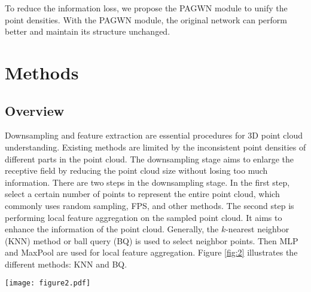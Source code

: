 \documentclass[10pt,twocolumn,letterpaper]{article}
\begin{document}
    To reduce the information loss, we propose the PAGWN module to unify the point densities.
    With the PAGWN module, the original network can perform better and maintain its structure unchanged.

\section{Methods}
    \subsection{Overview}
        Downsampling and feature extraction are essential procedures for 3D point cloud understanding. Existing methods are limited by the inconsistent point densities of different parts in the point cloud. The downsampling stage aims to enlarge the receptive field by reducing the point cloud size without losing too much information. There are two steps in the downsampling stage. In the first step, select a certain number of points to represent the entire point cloud, which commonly uses random sampling, FPS, and other methods. The second step is performing local feature aggregation on the sampled point cloud. It aims to enhance the information of the point cloud. Generally, the $k$-nearest neighbor (KNN) method or ball query (BQ) \cite{13Charles_2017} is used to select neighbor points. Then MLP and MaxPool are used for local feature aggregation. Figure \ref{fig:2} illustrates the different methods: KNN and BQ.
        \begin{figure*}[!htb]
        \centering
        \texttt{[image: figure2.pdf]}
        \caption{Different methods to obtain neighbor points. The neighborhood obtained by the KNN method has a fixed number of points but cannot limit the neighborhood volume. The neighborhood obtained by the BQ method has a fixed volume but no fixed number. (a) uses the $k$-nearest neighbor method to gain local region, while (b) uses ball query.}
        \label{fig:2}
        \end{figure*}
\end{document}

